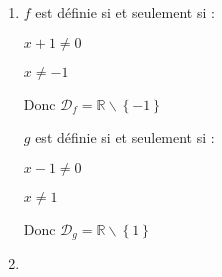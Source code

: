 \begin{corrige}
     \begin{enumerate}
          \item
          $f$ est définie si et seulement si :
          \par
          $x+1\neq 0$
          \par
          $x\neq -1$
          \par
          Donc $\mathscr D_{f}=\mathbb{R}\backslash\left\{-1\right\}$
          \par
          $g$ est définie si et seulement si :
          \par
          $x-1\neq 0$
          \par
          $x\neq 1$
          \par
          Donc $\mathscr D_{g}=\mathbb{R}\backslash\left\{1\right\}$
          \item
\\


\end{enumerate}
\end{corrige}
